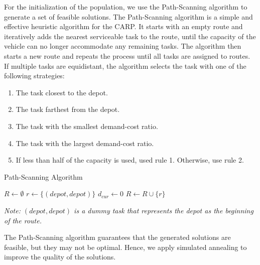 \documentclass[conference]{IEEEtran}
\begin{document}
For the initialization of the population, we use the Path-Scanning algorithm \cite{CARP} to generate a set of feasible solutions.
The Path-Scanning algorithm is a simple and effective heuristic algorithm for the CARP.
It starts with an empty route and iteratively adds the nearest serviceable task to the route, until the capacity of the vehicle can no longer accommodate any remaining tasks.
The algorithm then starts a new route and repeats the process until all tasks are assigned to routes.
If multiple tasks are equidistant, the algorithm selects the task with one of the following strategies:
\begin{enumerate}
    \item The task closest to the depot.
    \item The task farthest from the depot.
    \item The task with the smallest demand-cost ratio.
    \item The task with the largest demand-cost ratio.
    \item If less than half of the capacity is used, used rule 1. Otherwise, use rule 2.
\end{enumerate}

\begin{algorithm}
    \caption{Path-Scanning Algorithm}
    $R \leftarrow \emptyset$\;
    $r \leftarrow \{(depot, depot)\}$\;
    $d_{cur} \leftarrow 0$\;
    $R \leftarrow R \cup \{r\}$\;
\end{algorithm}
\textit{Note: $(depot, depot)$ is a dummy task that represents the depot as the beginning of the route.}

The Path-Scanning algorithm guarantees that the generated solutions are feasible, but they may not be optimal.
Hence, we apply simulated annealing to improve the quality of the solutions.
\end{document}
